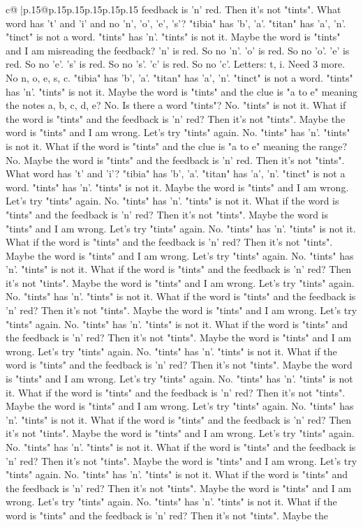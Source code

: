 \documentclass{article}
\begin{document}
{\begin{supertabular}{c@{$\;$}|p{.15\linewidth}@{}p{.15\linewidth}p{.15\linewidth}p{.15\linewidth}p{.15\linewidth}p{.15\linewidth}}
{{{feedback is 'n' red. Then it's not "tints". What word has 't' and 'i' and no 'n', 'o', 'e', 's'? "tibia" has 'b', 'a'. "titan" has 'a', 'n'. "tinct" is not a word. "tints" has 'n'. "tints" is not it. Maybe the word is "tints" and I am misreading the feedback? 'n' is red. So no 'n'. 'o' is red. So no 'o'. 'e' is red. So no 'e'. 's' is red. So no 's'. 'c' is red. So no 'c'. Letters: t, i. Need 3 more. No n, o, e, s, c. "tibia" has 'b', 'a'. "titan" has 'a', 'n'. "tinct" is not a word. "tints" has 'n'. "tints" is not it. Maybe the word is "tints" and the clue is "a to e" meaning the notes a, b, c, d, e? No. Is there a word "tints"? No. "tints" is not it. What if the word is "tints" and the feedback is 'n' red? Then it's not "tints". Maybe the word is "tints" and I am wrong. Let's try "tints" again. No. "tints" has 'n'. "tints" is not it. What if the word is "tints" and the clue is "a to e" meaning the range? No. Maybe the word is "tints" and the feedback is 'n' red. Then it's not "tints". What word has 't' and 'i'? "tibia" has 'b', 'a'. "titan" has 'a', 'n'. "tinct" is not a word. "tints" has 'n'. "tints" is not it. Maybe the word is "tints" and I am wrong. Let's try "tints" again. No. "tints" has 'n'. "tints" is not it. What if the word is "tints" and the feedback is 'n' red? Then it's not "tints". Maybe the word is "tints" and I am wrong. Let's try "tints" again. No. "tints" has 'n'. "tints" is not it. What if the word is "tints" and the feedback is 'n' red? Then it's not "tints". Maybe the word is "tints" and I am wrong. Let's try "tints" again. No. "tints" has 'n'. "tints" is not it. What if the word is "tints" and the feedback is 'n' red? Then it's not "tints". Maybe the word is "tints" and I am wrong. Let's try "tints" again. No. "tints" has 'n'. "tints" is not it. What if the word is "tints" and the feedback is 'n' red? Then it's not "tints". Maybe the word is "tints" and I am wrong. Let's try "tints" again. No. "tints" has 'n'. "tints" is not it. What if the word is "tints" and the feedback is 'n' red? Then it's not "tints". Maybe the word is "tints" and I am wrong. Let's try "tints" again. No. "tints" has 'n'. "tints" is not it. What if the word is "tints" and the feedback is 'n' red? Then it's not "tints". Maybe the word is "tints" and I am wrong. Let's try "tints" again. No. "tints" has 'n'. "tints" is not it. What if the word is "tints" and the feedback is 'n' red? Then it's not "tints". Maybe the word is "tints" and I am wrong. Let's try "tints" again. No. "tints" has 'n'. "tints" is not it. What if the word is "tints" and the feedback is 'n' red? Then it's not "tints". Maybe the word is "tints" and I am wrong. Let's try "tints" again. No. "tints" has 'n'. "tints" is not it. What if the word is "tints" and the feedback is 'n' red? Then it's not "tints". Maybe the word is "tints" and I am wrong. Let's try "tints" again. No. "tints" has 'n'. "tints" is not it. What if the word is "tints" and the feedback is 'n' red? Then it's not "tints". Maybe the word is "tints" and I am wrong. Let's try "tints" again. No. "tints" has 'n'. "tints" is not it. What if the word is "tints" and the feedback is 'n' red? Then it's not "tints". Maybe the }}}
\end{supertabular}}
\end{document}
